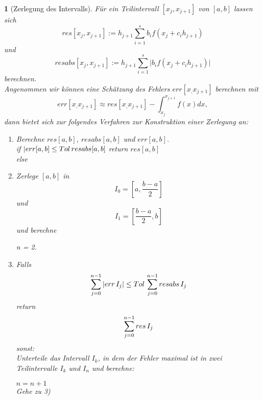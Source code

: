 \documentclass[12pt]{article}
\theoremstyle{break}
\newtheorem{nothing}[theorem]{}
\begin{document}
\begin{nothing}[Zerlegung des Intervalls]
Für ein Teilintervall $[x_j, x_{j+1}]$ von $[a,b]$ lassen sich 
$$res[x_j, x_{j+1}] := h_{j+1} \sum_{i=1}^s b_i f(x_j + c_i h_{j+1})$$
und
$$ resabs[x_j, x_{j+1}] := h_{j+1} \sum_{i=1}^s \vert b_i f(x_j + c_i h_{j+1}) \vert$$
berechnen.\\
Angenommen wir können eine Schätzung des Fehlers $err[x_, x_{j+1}]$ berechnen mit
$$err[x_, x_{j+1}] \approx res[x_, x_{j+1}] - \int_{x_j}^{x_{j+1}} f(x) dx,$$
dann bietet sich zur folgendes Verfahren zur Konstruktion einer Zerlegung an:
\begin{enumerate}
  \item Berechne $res[a,b]$, $resabs[a,b]$ und $err[a, b]$. \\
    if $\vert err[a,b] \leq Tol \thinspace resabs[a,b]$ return $res[a,b]$ \\
    else
    
  \item Zerlege $[a,b]$ in 
    $$I_0 = \left[a,\frac{b-a}{2}\right]$$
    und
    $$I_1 = \left[ \frac{b-a}{2}, b \right]$$
    und berechne 
    n = 2.
    
  \item Falls 
    $$ \sum_{j=0}^{n-1} \vert err \thinspace I_j \vert \leq Tol \thinspace \sum_{j=0}^{n-1} resabs \thinspace I_j$$
    return
    $$ \sum_{j=0}^{n-1} res \thinspace I_j$$
    sonst: \\
    Unterteile das Intervall $I_k$, in dem der Fehler maximal ist in zwei Teilintervalle $I_k$ und $I_n$ und berechne:
    $n =n+1$ \\
    Gehe zu 3)
\end{enumerate}
\end{nothing}
\end{document}
